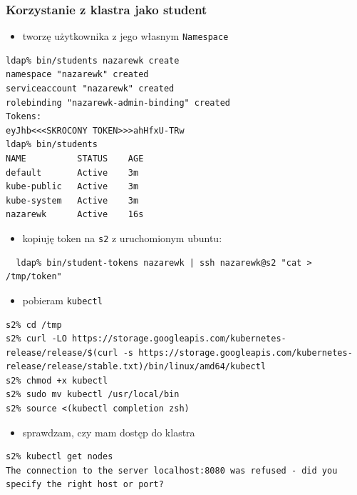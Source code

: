 \documentclass[a4paper,12pt,twoside,openany]{report}
\providecommand{\tightlist}{%
  \setlength{\itemsep}{0pt}\setlength{\parskip}{0pt}}
\newcommand{\passthrough}[1]{#1}
\begin{document}
\hypertarget{korzystanie-z-klastra-jako-student}{%
\subsubsection{Korzystanie z klastra jako
student}\label{korzystanie-z-klastra-jako-student}}

\begin{itemize}
\tightlist
\item
  tworzę użytkownika z jego własnym \passthrough{\lstinline!Namespace!}
\end{itemize}

\begin{lstlisting}
ldap% bin/students nazarewk create
namespace "nazarewk" created
serviceaccount "nazarewk" created
rolebinding "nazarewk-admin-binding" created
Tokens:
eyJhb<<<SKROCONY TOKEN>>>ahHfxU-TRw
ldap% bin/students
NAME          STATUS    AGE
default       Active    3m
kube-public   Active    3m
kube-system   Active    3m
nazarewk      Active    16s
\end{lstlisting}

\begin{itemize}
\tightlist
\item
  kopiuję token na \passthrough{\lstinline!s2!} z uruchomionym ubuntu:
\end{itemize}

\begin{lstlisting}
  ldap% bin/student-tokens nazarewk | ssh nazarewk@s2 "cat > /tmp/token"
\end{lstlisting}

\begin{itemize}
\tightlist
\item
  pobieram \passthrough{\lstinline!kubectl!}
\end{itemize}

\begin{lstlisting}
s2% cd /tmp
s2% curl -LO https://storage.googleapis.com/kubernetes-release/release/$(curl -s https://storage.googleapis.com/kubernetes-release/release/stable.txt)/bin/linux/amd64/kubectl
s2% chmod +x kubectl
s2% sudo mv kubectl /usr/local/bin
s2% source <(kubectl completion zsh)
\end{lstlisting}

\begin{itemize}
\tightlist
\item
  sprawdzam, czy mam dostęp do klastra
\end{itemize}

\begin{lstlisting}
s2% kubectl get nodes
The connection to the server localhost:8080 was refused - did you specify the right host or port?
\end{lstlisting}
\end{document}
